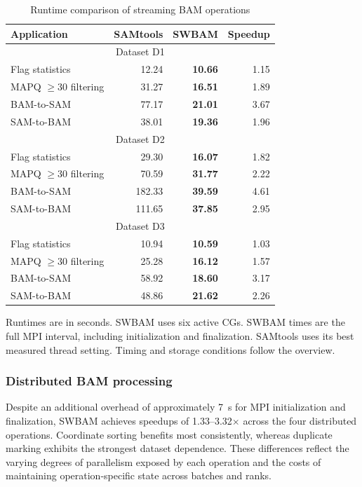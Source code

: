 \documentclass[lettersize,journal]{IEEEtran}
\begin{document}
\begin{table}[!t]
\centering
\begin{threeparttable}
\caption{Runtime comparison of streaming BAM operations}
\label{tab:streaming-bam}
\footnotesize
\setlength{\tabcolsep}{3pt}
\begin{tabular*}{\columnwidth}{@{\extracolsep{\fill}}lrrr@{}}
\toprule
Application & SAMtools & SWBAM & Speedup \\
\midrule
\multicolumn{4}{c}{Dataset D1} \\
\midrule
Flag statistics & 12.24 & \textbf{10.66} & 1.15 \\
MAPQ $\geq 30$ filtering & 31.27 & \textbf{16.51} & 1.89 \\
BAM-to-SAM & 77.17 & \textbf{21.01} & 3.67 \\
SAM-to-BAM & 38.01 & \textbf{19.36} & 1.96 \\
\midrule
\multicolumn{4}{c}{Dataset D2} \\
\midrule
Flag statistics & 29.30 & \textbf{16.07} & 1.82 \\
MAPQ $\geq 30$ filtering & 70.59 & \textbf{31.77} & 2.22 \\
BAM-to-SAM & 182.33 & \textbf{39.59} & 4.61 \\
SAM-to-BAM & 111.65 & \textbf{37.85} & 2.95 \\
\midrule
\multicolumn{4}{c}{Dataset D3} \\
\midrule
Flag statistics & 10.94 & \textbf{10.59} & 1.03 \\
MAPQ $\geq 30$ filtering & 25.28 & \textbf{16.12} & 1.57 \\
BAM-to-SAM & 58.92 & \textbf{18.60} & 3.17 \\
SAM-to-BAM & 48.86 & \textbf{21.62} & 2.26 \\
\bottomrule
\end{tabular*}
\begin{tablenotes}[flushleft]
\scriptsize
\item Runtimes are in seconds.
SWBAM uses six active CGs.
SWBAM times are the full MPI interval, including initialization and finalization.
SAMtools uses its best measured thread setting.
Timing and storage conditions follow the overview.
\end{tablenotes}
\end{threeparttable}
\end{table}

\subsubsection{Distributed BAM processing}
Despite an additional overhead of approximately 7~s for MPI initialization and finalization, SWBAM achieves speedups of 1.33--3.32$\times$ across the four distributed operations. 
Coordinate sorting benefits most consistently, whereas duplicate marking exhibits the strongest dataset dependence. 
These differences reflect the varying degrees of parallelism exposed by each operation and the costs of maintaining operation-specific state across batches and ranks.
\end{document}
